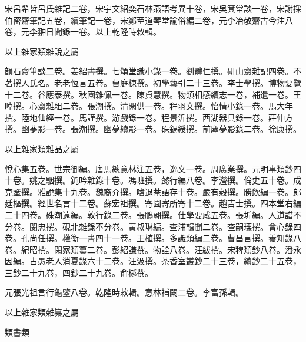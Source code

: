 \begin{pinyinscope}
宋呂希哲呂氏雜記二卷，宋宇文紹奕石林燕語考異十卷，宋吳箕常談一卷，宋謝採伯密齋筆記五卷，續筆記一卷，宋鄭至道琴堂諭俗編二卷，元李冶敬齋古今注八卷，元李翀日聞錄一卷。以上乾隆時敕輯。

以上雜家類雜說之屬

韻石齋筆談二卷。姜紹書撰。七頌堂識小錄一卷。劉體仁撰。研山齋雜記四卷。不著撰人氏名。老老恆言五卷。曹庭棟撰。初學藝引二十三卷。李士學撰。博物要覽十二卷。谷應泰撰。秋園雜佩一卷。陳貞慧撰。物類相感續志一卷，補遺一卷。王晫撰。心齋雜俎二卷。張潮撰。清閑供一卷。程羽文撰。怡情小錄一卷。馬大年撰。陸地仙經一卷。馬謹撰。游戲錄一卷。程景沂撰。西湖器具錄一卷。莊仲方撰。幽夢影一卷。張潮撰。幽夢續影一卷。硃錫綬撰。前塵夢影錄二卷。徐康撰。

以上雜家類雜品之屬

悅心集五卷。世宗御編。唐馬總意林注五卷，逸文一卷。周廣業撰。元明事類鈔四十卷。姚之駰撰。鈍吟雜錄十卷。馮班撰。懿行編八卷。李瀅撰。倫史五十卷。成克鞏撰。雅說集十九卷。魏裔介撰。嗜退菴語存十卷。嚴有穀撰。勝飲編一卷。郎廷樞撰。經世名言十二卷。蘇宏祖撰。寄園寄所寄十二卷。趙吉士撰。四本堂右編二十四卷。硃潮遠編。敦行錄二卷。張鵬翮撰。仕學要咸五卷。張圻編。人道譜不分卷。閔忠撰。硯北雜錄不分卷。黃叔琳編。查浦輯聞二卷。查嗣瑮撰。會心錄四卷。孔尚任撰。權衡一書四十一卷。王植撰。多識類編二卷。曹昌言撰。養知錄八卷。紀昭撰。閑家類纂二卷。彭紹謙撰。物詮八卷。汪紱撰。宋稗類鈔八卷。潘永因編。古愚老人消夏錄六十二卷。汪汲撰。茶香室叢鈔二十三卷，續鈔二十五卷，三鈔二十九卷，四鈔二十九卷。俞樾撰。

元張光祖言行龜鑒八卷。乾隆時敕輯。意林補闕二卷。李富孫輯。

以上雜家類雜纂之屬

類書類


\end{pinyinscope}
